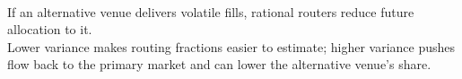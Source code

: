\begin{empiricalfinding} \\
If an alternative venue delivers volatile fills, rational routers reduce future allocation to it.\\
Lower variance makes routing fractions easier to estimate; higher variance pushes flow back to the primary market and can lower the alternative venue's share.
\end{empiricalfinding}
